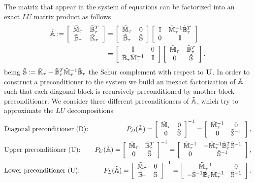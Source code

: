 The matrix that appear in the system of equations  can be factorized into an exact $LU$ matrix product as follows
\begin{align}
\label{eq-C5_NSLUform}
\tilde{\mathbb{A}}:=\left[\begin{array}{cc}
\tilde{\mathbb{M}}_\tau&\tilde{\mathbb{B}}_\tau^T\\
\tilde{\mathbb{B}}_\tau&\tilde{\mathbb{K}}_\tau
\end{array}\right]&=\left[\begin{array}{cc}
\tilde{\mathbb{M}}_\tau&0\\
\tilde{\mathbb{B}}_\tau&\tilde{\mathbb{S}}
\end{array}\right]\left[\begin{array}{cc}
\mathbb{I}&\tilde{\mathbb{M}}_\tau^{-1}\tilde{\mathbb{B}}_\tau^T\\
0&\mathbb{I}
\end{array}\right]\\\nonumber
&=\left[\begin{array}{cc}
\mathbb{I}&0\\
\tilde{\mathbb{B}}_\tau\tilde{\mathbb{M}}_\tau^{-1}&\mathbb{I}
\end{array}\right]\left[\begin{array}{cc}
\tilde{\mathbb{M}}_\tau&\tilde{\mathbb{B}}_\tau^T\\
0&\tilde{\mathbb{S}}
\end{array}\right],
\end{align}
being $\tilde{\mathbb{S}}:=\tilde{\mathbb{K}}_\tau-\tilde{\mathbb{B}}_\tau^T\tilde{\mathbb{M}}_\tau^{-1}\tilde{\mathbb{B}}_\tau$ the Schur complement with respect to ${\bf U}$. In order to construct a preconditioner to the system  we build an inexact factorization of $\tilde{\mathbb{A}}$ such that each diagonal block is recursively preconditioned by another block preconditioner. We consider three different preconditioners of $\tilde{\mathbb{A}}$, which try to approximate the $LU$ decompositions 
\begin{align}
\label{eq-C5_NS_d_precond}
&\mbox{Diagonal preconditioner (D):}&P_D(\tilde{\mathbb{A}})=\left[\begin{array}{cc}
\tilde{\mathbb{M}}_\tau&0\\
0&\tilde{\mathbb{S}}
\end{array}\right]^{-1}=\left[\begin{array}{cc}
\tilde{\mathbb{M}}_\tau^{-1}&0\\
0&\tilde{\mathbb{S}}^{-1}
\end{array}\right],\\
\label{eq-C5_NS_u_precond}
&\mbox{Upper preconditioner (U):}&P_U(\tilde{\mathbb{A}})=\left[\begin{array}{cc}
\tilde{\mathbb{M}}_\tau&\tilde{\mathbb{B}}_\tau^T\\
0&\tilde{\mathbb{S}}
\end{array}\right]^{-1}=\left[\begin{array}{cc}
\tilde{\mathbb{M}}_\tau^{-1}&-\tilde{\mathbb{M}}_\tau^{-1}\tilde{\mathbb{B}}_\tau^T\tilde{\mathbb{S}}^{-1}\\
0&\tilde{\mathbb{S}}^{-1}
\end{array}\right],\\
\label{eq-C5_NS_l_precond}
&\mbox{Lower preconditioner (U):}&P_L(\tilde{\mathbb{A}})=\left[\begin{array}{cc}
\tilde{\mathbb{M}}_\tau&0\\
\tilde{\mathbb{B}}_\tau&\tilde{\mathbb{S}}
\end{array}\right]^{-1}=\left[\begin{array}{cc}
\tilde{\mathbb{M}}_\tau^{-1}&0\\
-\tilde{\mathbb{S}}^{-1}\tilde{\mathbb{B}}_\tau\tilde{\mathbb{M}}_\tau^{-1}&\tilde{\mathbb{S}}^{-1}
\end{array}\right].
\end{align}

